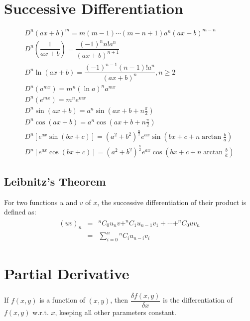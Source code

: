 \documentclass[openany, oneside]{book}
\begin{document}
\large{\chapter{Successive Differentiation}}
\begin{align}
D^n (ax+b)^m=m(m-1)\cdots(m-n+1) a^n (ax+b)^{m-n}\\
D^n \left(\dfrac{1}{ax+b}\right)=\dfrac{(-1)^n n!a^n}{(ax+b)^{n+1}}\\
D^n \ln(ax+b)=\dfrac{(-1)^{n-1} (n-1)!a^n}{(ax+b)^n}, n \geq 2\\
D^n (a^{mx})=m^n (\ln a)^n a^{mx}\\
D^n (e^{mx})=m^n e^{mx}\\
D^n \sin (ax+b)=a^n \sin(ax+b+n\frac{\pi}{2})\\
D^n \cos (ax+b)=a^n \cos(ax+b+n\frac{\pi}{2})\\
D^n [e^{ax} \sin(bx+c)]=(a^2+b^2)^{\frac{n}{2}} e^{ax} \sin(bx+c+n\arctan\frac{b}{a})\\
D^n [e^{ax} \cos(bx+c)]=(a^2+b^2)^{\frac{n}{2}} e^{ax} \cos(bx+c+n\arctan\frac{b}{a})
\end{align}

\section{Leibnitz's Theorem}
For two functions $u$ and $v$ of $x$, the successive differentiation of their product is defined as:
\begin{equation}
\begin{aligned}
\begin{split}
(uv)_n & = &^nC_0 u_n v+^nC_1 u_{n-1} v_1+\cdots+^nC_0 u v_n\\
 & = & \sum_{i=0}^n {^nC_i} u_{n-i} v_i
\end{split}
\end{aligned}
\end{equation}

\large{\chapter{Partial Derivative}}
If $f(x,y)$ is a function of $(x,y)$, then $\dfrac{\delta f(x,y)}{\delta x}$ is the differentiation of $f(x,y)$ w.r.t. $x$, keeping all other parameters constant.
\end{document}
